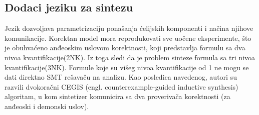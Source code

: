 \documentclass[a4paper]{article}
\begin{document}
\subsection{Dodaci jeziku za sintezu}
Jezik dozvoljava parametrizaciju ponašanja ćelijskih komponenti i načina njihove komunikacije. Korektan model mora reprodukovati sve uočene eksperimente, što je obuhvaćeno anđeoskim uslovom korektnosti, koji predstavlja formulu sa dva nivoa kvantifikacije(2NK). Iz toga sledi da je problem sinteze formula sa tri nivoa kvantifikacije(3NK). Formule koje su višeg nivoa kvantifikacije od 1 ne mogu se dati direktno SMT rešavaču na analizu. Kao posledica navedenog, autori su razvili dvokoračni CEGIS (engl. counterexample-guided inductive synthesis) algoritam, u kom sintetizer komunicira sa dva proverivača korektnosti (za anđeoski i demonski uslov).
\end{document}

